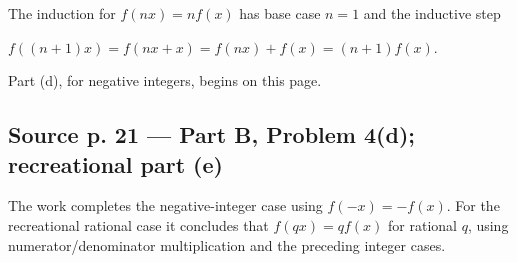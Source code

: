 The induction for \(f\left( {nx} \right) = nf(x)\) has base case \(n = 1\) and the inductive step

\(f\left( {\left( {n + 1} \right)x} \right) = f\left( {nx + x} \right) = f\left( {nx} \right) + f(x) = \left( {n + 1} \right)f(x)\).

Part (d), for negative integers, begins on this page.

\subsection{Source p. 21 --- Part B, Problem 4(d); recreational part (e)}

The work completes the negative-integer case using \(f\left( {- x} \right) = - f(x)\). For the recreational rational case it concludes that \(f\left( {qx} \right) = qf(x)\) for rational \(q\), using numerator/denominator multiplication and the preceding integer cases.
